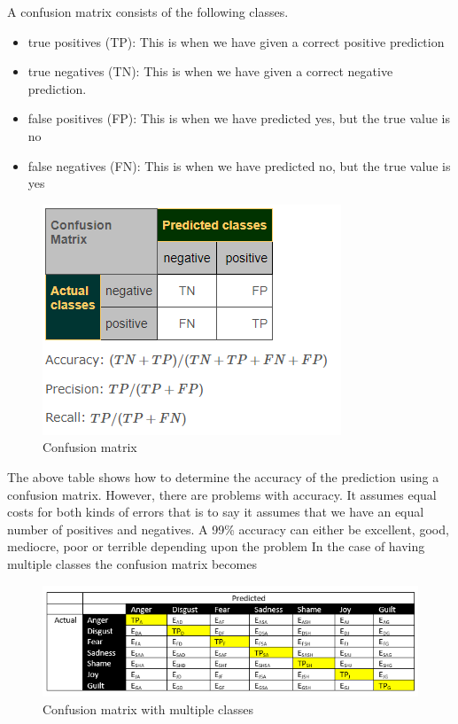 A confusion matrix consists of the following classes.
 \begin{itemize}

\item
true positives (TP): This is when we have given a correct positive prediction

\item
true negatives (TN): This is when we have given a correct negative prediction.

\item
false positives (FP): This is when we have predicted yes, but the true value is no

\item
false negatives (FN): This is when we have predicted no, but the true value is yes

\end{itemize}

\begin{figure}[h]
    \centering
    \includegraphics{images/confusion_matrix.png}
    \caption{Confusion matrix}
\end{figure}

  The above table shows how to determine the accuracy of the prediction using a confusion matrix. However, there are problems with accuracy. It assumes equal costs for both kinds of errors that is to say it assumes that we have an equal number of positives and negatives. A 99\% accuracy can either be excellent, good, mediocre, poor or terrible depending upon the problem
\clearpage
In the case of having multiple classes the confusion matrix becomes


\begin{figure}[h]
    \centering
    \includegraphics{images/confusion_matrix_2.png}
    \caption{Confusion matrix with multiple classes}
\end{figure}

